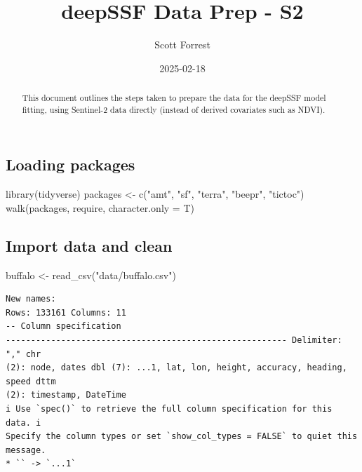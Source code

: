 \documentclass[
  letterpaper,
  DIV=11,
  numbers=noendperiod]{scrartcl}
\title{deepSSF Data Prep - S2}
\author{Scott Forrest}
\date{2025-02-18}
\newenvironment{Shaded}{\begin{snugshade}}{\end{snugshade}}
\newcommand{\AttributeTok}[1]{\textcolor[rgb]{0.40,0.45,0.13}{#1}}
\newcommand{\FunctionTok}[1]{\textcolor[rgb]{0.28,0.35,0.67}{#1}}
\newcommand{\NormalTok}[1]{\textcolor[rgb]{0.00,0.23,0.31}{#1}}
\newcommand{\OtherTok}[1]{\textcolor[rgb]{0.00,0.23,0.31}{#1}}
\newcommand{\StringTok}[1]{\textcolor[rgb]{0.13,0.47,0.30}{#1}}
\renewcommand*\contentsname{Table of contents}
\newcommand\contentsname{Table of contents}
\begin{document}
\maketitle
\begin{abstract}
This document outlines the steps taken to prepare the data for the
deepSSF model fitting, using Sentinel-2 data directly (instead of
derived covariates such as NDVI).
\end{abstract}

\renewcommand*\contentsname{Table of contents}
{
\setcounter{tocdepth}{3}
\tableofcontents
}

\subsection{Loading packages}\label{loading-packages}

\begin{Shaded}
\begin{Highlighting}[]
\FunctionTok{library}\NormalTok{(tidyverse)}
\NormalTok{packages }\OtherTok{\textless{}{-}} \FunctionTok{c}\NormalTok{(}\StringTok{"amt"}\NormalTok{, }\StringTok{"sf"}\NormalTok{, }\StringTok{"terra"}\NormalTok{, }\StringTok{"beepr"}\NormalTok{, }\StringTok{"tictoc"}\NormalTok{)}
\FunctionTok{walk}\NormalTok{(packages, require, }\AttributeTok{character.only =}\NormalTok{ T)}
\end{Highlighting}
\end{Shaded}

\subsection{Import data and clean}\label{import-data-and-clean}

\begin{Shaded}
\begin{Highlighting}[]
\NormalTok{buffalo }\OtherTok{\textless{}{-}} \FunctionTok{read\_csv}\NormalTok{(}\StringTok{"data/buffalo.csv"}\NormalTok{)}
\end{Highlighting}
\end{Shaded}

\begin{verbatim}
New names:
Rows: 133161 Columns: 11
-- Column specification
-------------------------------------------------------- Delimiter: "," chr
(2): node, dates dbl (7): ...1, lat, lon, height, accuracy, heading, speed dttm
(2): timestamp, DateTime
i Use `spec()` to retrieve the full column specification for this data. i
Specify the column types or set `show_col_types = FALSE` to quiet this message.
* `` -> `...1`
\end{verbatim}
\end{document}
